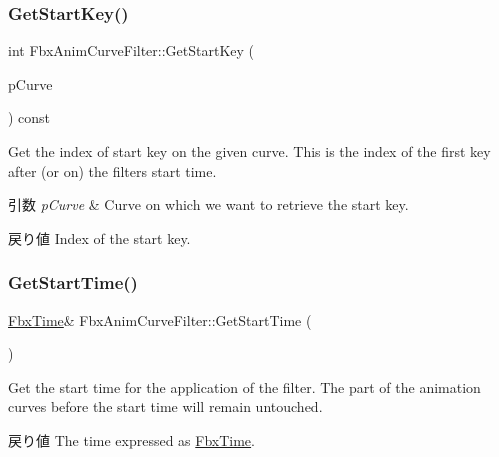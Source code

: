 \subsubsection{\texorpdfstring{Get\+Start\+Key()}{GetStartKey()}}
{\footnotesize\ttfamily int Fbx\+Anim\+Curve\+Filter\+::\+Get\+Start\+Key (\begin{DoxyParamCaption}\item[{\hyperlink{class_fbx_anim_curve}{Fbx\+Anim\+Curve} \&}]{p\+Curve }\end{DoxyParamCaption}) const}

Get the index of start key on the given curve. This is the index of the first key after (or on) the filter\textquotesingle{}s start time. 
\begin{DoxyParams}{引数}
{\em p\+Curve} & Curve on which we want to retrieve the start key. \\
\hline
\end{DoxyParams}
\begin{DoxyReturn}{戻り値}
Index of the start key. 
\end{DoxyReturn}
\mbox{\label{class_fbx_anim_curve_filter_a0695d801a1a8d5e6ca9f4e992d9af7ff}} 
\subsubsection{\texorpdfstring{Get\+Start\+Time()}{GetStartTime()}}
{\footnotesize\ttfamily \hyperlink{class_fbx_time}{Fbx\+Time}\& Fbx\+Anim\+Curve\+Filter\+::\+Get\+Start\+Time (\begin{DoxyParamCaption}{ }\end{DoxyParamCaption})}

Get the start time for the application of the filter. The part of the animation curves before the start time will remain untouched. \begin{DoxyReturn}{戻り値}
The time expressed as \hyperlink{class_fbx_time}{Fbx\+Time}. 
\end{DoxyReturn}
\mbox{\label{class_fbx_anim_curve_filter_a94f41fc2b018813560c250c598602cb2}} 
